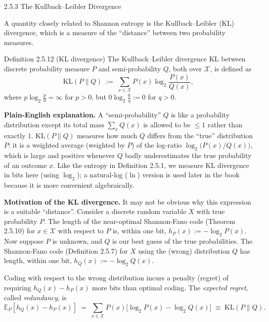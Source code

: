 \documentclass[aspectratio=169,10pt]{beamer}
\newcommand{\bbE}{\mathbb{E}}
\begin{document}
\begin{frame}[allowframebreaks]{2.5.3 The Kullback--Leibler Divergence}

A quantity closely related to Shannon entropy is the Kullback--Leibler (KL)
divergence, which is a measure of the ``distance'' between two probability
measures.

\begin{block}{Definition 2.5.12 (KL divergence)}
The Kullback--Leibler divergence $\mathrm{KL}$ between discrete probability
measure $P$ and semi-probability $Q$, both over $\mathcal{X}$, is defined as
\[
  \mathrm{KL}(P\|Q) \;:=\; \sum_{x \in \mathcal{X}} P(x) \log_2 \frac{P(x)}{Q(x)},
\]
where $p \log_2 \tfrac{p}{0} = \infty$ for $p > 0$, but $0 \log_2 \tfrac{0}{q} := 0$ for $q > 0$.
\end{block}

\textbf{Plain-English explanation.} A ``semi-probability'' $Q$ is like a
probability distribution except its total mass $\sum_x Q(x)$ is allowed to
be $\le 1$ rather than exactly $1$. $\mathrm{KL}(P\|Q)$ measures how much
$Q$ differs from the ``true'' distribution $P$: it is a weighted average
(weighted by $P$) of the log-ratio $\log_2\!\big(P(x)/Q(x)\big)$, which is
large and positive whenever $Q$ badly underestimates the true probability
of an outcome $x$. Like the entropy in Definition 2.5.1, we measure KL
divergence in bits here (using $\log_2$); a natural-log ($\ln$) version is
used later in the book because it is more convenient algebraically.

\framebreak

\textbf{Motivation of the KL divergence.} It may not be obvious why this
expression is a suitable ``distance''. Consider a discrete random variable
$X$ with true probability $P$. The length of the near-optimal Shannon-Fano
code (Theorem 2.5.10) for $x \in \mathcal{X}$ with respect to $P$ is, within
one bit, $h_P(x) := -\log_2 P(x)$. Now suppose $P$ is unknown, and $Q$ is
our best guess of the true probabilities. The Shannon-Fano code
(Definition 2.5.7) for $X$ using the (wrong) distribution $Q$ has length,
within one bit, $h_Q(x) := -\log_2 Q(x)$.

Coding with respect to the wrong distribution incurs a penalty (regret) of
requiring $h_Q(x) - h_P(x)$ more bits than optimal coding. The
\emph{expected regret}, called \emph{redundancy}, is
\[
  \bbE_P[h_Q(x) - h_P(x)] \;=\; \sum_{x \in \mathcal{X}} P(x)\big[\log_2 P(x) - \log_2 Q(x)\big] \;\equiv\; \mathrm{KL}(P\|Q).
\]


\end{frame}
\end{document}
